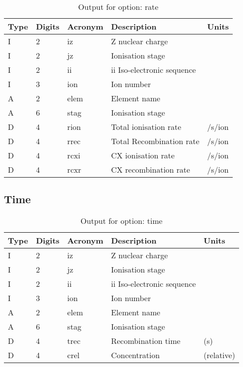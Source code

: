 \begin{table}[!p]
\caption{Output for option: rate}
\label{tabout:rate}
\begin{tabular}{lllll}
\hline
Type & Digits & Acronym & Description & Units \\ 
\hline
I &  2 & iz   & Z nuclear charge                 &                  \\
I &  2 & jz   & Ionisation stage                 &                  \\
I &  2 & ii   & ii Iso-electronic sequence       &                  \\
I &  3 & ion  & Ion number                       &                  \\
A &  2 & elem & Element name                     &                  \\
A &  6 & stag & Ionisation stage                 &                  \\
D &  4 & rion & Total ionisation rate            & /s/ion           \\
D &  4 & rrec & Total Recombination rate         & /s/ion           \\
D &  4 & rcxi & CX ionisation rate               & /s/ion           \\
D &  4 & rcxr & CX recombination rate            & /s/ion           \\
\hline
\end{tabular}
\end{table}

\subsection{Time}

\begin{table}[!p]
\caption{Output for option: time}
\label{tabout:time}
\begin{tabular}{lllll}
\hline
Type & Digits & Acronym & Description & Units \\ 
\hline
I &  2 & iz   & Z nuclear charge                 &                  \\
I &  2 & jz   & Ionisation stage                 &                  \\
I &  2 & ii   & ii Iso-electronic sequence       &                  \\
I &  3 & ion  & Ion number                       &                  \\
A &  2 & elem & Element name                     &                  \\
A &  6 & stag & Ionisation stage                 &                  \\
D &  4 & trec & Recombination time               & (s)              \\
D &  4 & crel & Concentration                    & (relative)       \\
\hline
\end{tabular}
\end{table}

